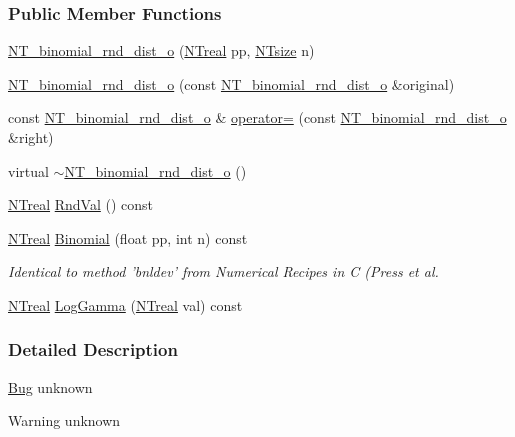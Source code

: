 \subsubsection*{Public Member Functions}
\begin{DoxyCompactItemize}
\item 
\hyperlink{class_n_t__binomial__rnd__dist__o_a2f7db19e9805db28c7641a7efc2c4a46}{NT\_\-binomial\_\-rnd\_\-dist\_\-o} (\hyperlink{nt__types_8h_a814a97893e9deb1eedcc7604529ba80d}{NTreal} pp, \hyperlink{nt__types_8h_a06c124f2e4469769b58230253ce0560b}{NTsize} n)
\item 
\hyperlink{class_n_t__binomial__rnd__dist__o_a64cc40874debbf989c3b94667b81916f}{NT\_\-binomial\_\-rnd\_\-dist\_\-o} (const \hyperlink{class_n_t__binomial__rnd__dist__o}{NT\_\-binomial\_\-rnd\_\-dist\_\-o} \&original)
\item 
const \hyperlink{class_n_t__binomial__rnd__dist__o}{NT\_\-binomial\_\-rnd\_\-dist\_\-o} \& \hyperlink{class_n_t__binomial__rnd__dist__o_aa954a63ced0bf4e715d001f4e146ca9c}{operator=} (const \hyperlink{class_n_t__binomial__rnd__dist__o}{NT\_\-binomial\_\-rnd\_\-dist\_\-o} \&right)
\item 
virtual \hyperlink{class_n_t__binomial__rnd__dist__o_a0b8edc0e2e0f4305b130394febf3a483}{$\sim$NT\_\-binomial\_\-rnd\_\-dist\_\-o} ()
\item 
\hyperlink{nt__types_8h_a814a97893e9deb1eedcc7604529ba80d}{NTreal} \hyperlink{class_n_t__binomial__rnd__dist__o_aaf32e54ad56f03099eceba5d4e17ec86}{RndVal} () const 
\item 
\hyperlink{nt__types_8h_a814a97893e9deb1eedcc7604529ba80d}{NTreal} \hyperlink{class_n_t__binomial__rnd__dist__o_a4836939e3cf86c0151de846b88581ffa}{Binomial} (float pp, int n) const 
\begin{DoxyCompactList}\small\item\em Identical to method 'bnldev' from Numerical Recipes in C (Press et al. \item\end{DoxyCompactList}\item 
\hyperlink{nt__types_8h_a814a97893e9deb1eedcc7604529ba80d}{NTreal} \hyperlink{class_n_t__binomial__rnd__dist__o_a60074ceb2c45f29b23db44fbb4c166f0}{LogGamma} (\hyperlink{nt__types_8h_a814a97893e9deb1eedcc7604529ba80d}{NTreal} val) const 
\end{DoxyCompactItemize}


\subsubsection{Detailed Description}
\begin{Desc}
\item[\hyperlink{bug__bug000095}{Bug}]unknown \end{Desc}
\begin{DoxyWarning}{Warning}
unknown 
\end{DoxyWarning}


